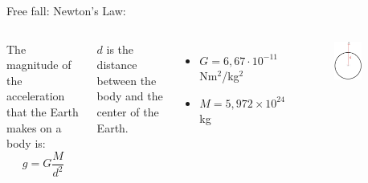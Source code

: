 \documentclass[]{beamer}
\begin{document}
\begin{frame}
    Free fall:
    \vspace{3mm}
Newton's Law:
\vspace{3mm}


  \begin{columns}[c]
    \column{2in}  %
   
    The magnitude of the acceleration that the Earth makes on a body is:
    \begin{equation*}
        g=G\frac{M}{d^2}
    \end{equation*}
    
    $d$ is the distance between the body and the center of the Earth.
    \vspace{2mm}

    \begin{itemize}
        \item $G= 6,67·10^{-11} $ Nm$^{2}$/kg$^{2}$
        \pause

        \item $M=5,972 \times 10^{24}$ kg
    \end{itemize}
    
 
    \column{2.5in}
    
    \begin{figure}[h!]  
        \includegraphics[width=0.6\textwidth]{images/5.jpg}
       
      \end{figure}
 
 
 
    \end{columns}

\end{frame}  
\end{document}
